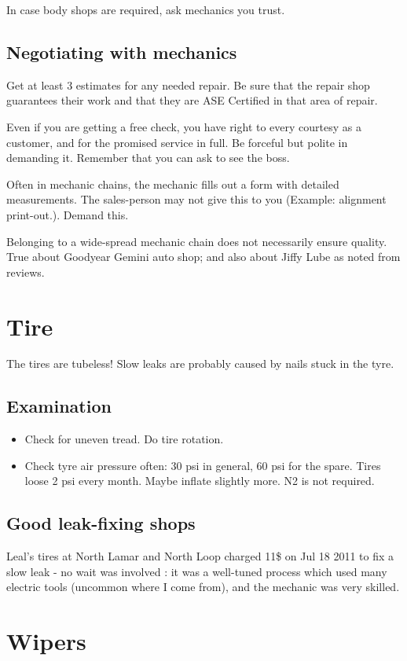 \documentclass[oneside, article]{memoir}
\begin{document}
In case body shops are required, ask mechanics you trust.

\subsection{Negotiating with mechanics}
Get at least 3 estimates for any needed repair. Be sure that the repair shop guarantees their work and that they are ASE Certified in that area of repair.

Even if you are getting a free check, you have right to every courtesy as a customer, and for the promised service in full. Be forceful but polite in demanding it. Remember that you can ask to see the boss.

Often in mechanic chains, the mechanic fills out a form with detailed measurements. The sales-person may not give this to you (Example: alignment print-out.). Demand this.

Belonging to a wide-spread mechanic chain does not necessarily ensure quality. True about Goodyear Gemini auto shop; and also about Jiffy Lube as noted from reviews.

\section{Tire}
The tires are tubeless! Slow leaks are probably caused by nails stuck in the tyre.

\subsection{Examination}
\begin{itemize}
\item Check for uneven tread. Do tire rotation.
\item Check tyre air pressure often: 30 psi in general, 60 psi for the spare. Tires loose 2 psi every month. Maybe inflate slightly more. N2 is not required.
\end{itemize}

\subsection{Good leak-fixing shops}
Leal's tires at North Lamar and North Loop charged 11\$ on Jul 18 2011 to fix a slow leak - no wait was involved : it was a well-tuned process which used many electric tools (uncommon where I come from), and the mechanic was very skilled.

\section{Wipers}
\end{document}
